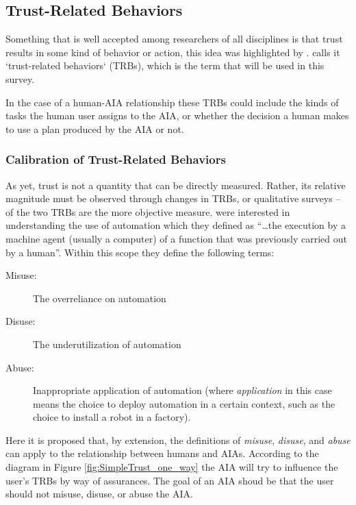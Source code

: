 \subsection{Trust-Related Behaviors} \label{sec:trbs}
Something that is well accepted among researchers of all disciplines is that trust results in some kind of behavior or action, this idea was highlighted by \citet{Lewis1985-pr}.  \citet{McKnight2001-fa} calls it `trust-related behaviors` (TRBs), which is the term that will be used in this survey.

In the case of a human-AIA relationship these TRBs could include the kinds of tasks the human user assigns to the AIA, or whether the decision a human makes to use a plan produced by the AIA or not. 

\subsubsection{Calibration of Trust-Related Behaviors}
    As yet, trust is not a quantity that can be directly measured. Rather, its relative magnitude must be observed through changes in TRBs, or qualitative surveys -- of the two TRBs are the more objective measure. \citet{Parasuraman1997-co} were interested in understanding the use of automation which they defined as ``\ldots the execution by a machine agent (usually a computer) of a function that was previously carried out by a human''. Within this scope they define the following terms:
    
    \begin{description}
        \item [Misuse:] The overreliance on automation
        \item [Disuse:] The underutilization of automation
        \item [Abuse:] Inappropriate application of automation (where \emph{application} in this case means the choice to deploy automation in a certain context, such as the choice to install a robot in a factory).
    \end{description}

    Here it is proposed that, by extension, the definitions of \emph{misuse}, \emph{disuse}, and \emph{abuse} can apply to the relationship between humans and AIAs. According to the diagram in Figure \ref{fig:SimpleTrust_one_way} the AIA will try to influence the user's TRBs by way of assurances. The goal of an AIA shoud be that the user should not misuse, disuse, or abuse the AIA.
    
